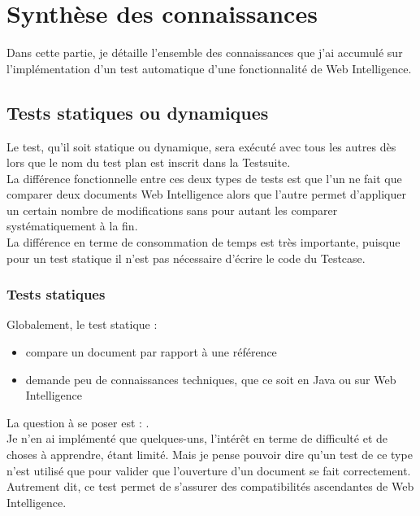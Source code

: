 

\section{Synth\`{e}se des connaissances}
Dans cette partie, je d\'{e}taille l'ensemble des connaissances que j'ai accumul\'{e} sur l'impl\'{e}mentation d'un test automatique d'une fonctionnalit\'{e} de Web Intelligence.\\

\subsection{Tests statiques ou dynamiques}

Le test, qu'il soit statique ou dynamique, sera ex\'{e}cut\'{e} avec tous les autres d\`{e}s lors que le nom du test plan est inscrit dans la \gls{Testsuite}.\\
La diff\'{e}rence fonctionnelle entre ces deux types de tests est que l'un ne fait que comparer deux documents Web Intelligence alors que l'autre permet d'appliquer un certain nombre de modifications sans pour autant les comparer syst\'{e}matiquement \`{a} la fin.\\
La diff\'{e}rence en terme de consommation de temps est tr\`{e}s importante, puisque pour un test statique il n'est pas n\'{e}cessaire d'\'{e}crire le code du \gls{Testcase}. 

\subsubsection{Tests statiques}
Globalement, le test statique :

\begin{itemize}
	\item compare un document par rapport \`{a} une r\'{e}f\'{e}rence
	\item demande peu de connaissances techniques, que ce soit en \gls{Java} ou sur Web Intelligence
\end{itemize}

La question \`{a} se poser est : .\\
Je n'en ai impl\'{e}menté que quelques-uns, l'int\'{e}r\^{e}t en terme de difficult\'{e} et de choses \`{a} apprendre, \'{e}tant limit\'{e}. Mais je pense pouvoir dire qu'un test de ce type n'est utilis\'{e} que pour valider que l'ouverture d'un document se fait correctement. Autrement dit, ce test permet de s'assurer des compatibilit\'{e}s ascendantes de Web Intelligence.\\

